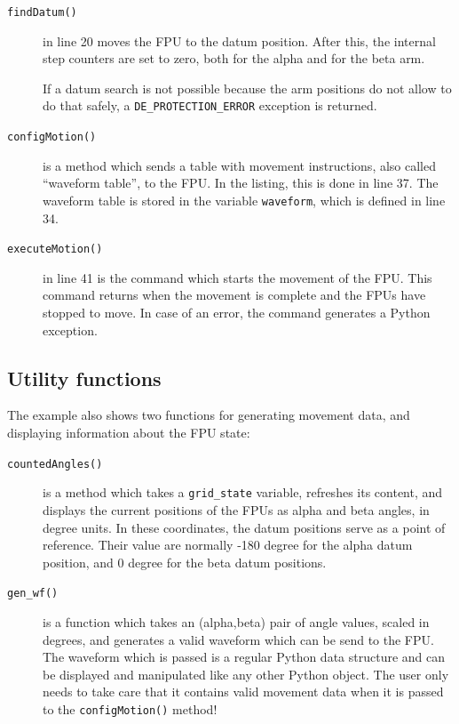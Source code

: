 \documentclass[11pt,a4paper]{scrartcl}
\begin{document}
\begin{description}
\item[\texttt{findDatum()}] in line 20 moves the FPU to the datum
  position. After this, the internal step counters are set to zero,
  both for the alpha and for the beta arm.

  If a datum search is not possible because the arm positions do not
  allow to do that safely, a \texttt{DE\_PROTECTION\_ERROR} exception
  is returned.

\item[\texttt{configMotion()}] is a method which sends a table with
  movement instructions, also called ``waveform table'', to the
  FPU. In the listing, this is done in line 37. The waveform table is
  stored in the variable \texttt{waveform}, which is defined in line
  34.

\item[\texttt{executeMotion()}] in line 41 is the command which starts
  the movement of the FPU. This command returns when the movement is
  complete and the FPUs have stopped to move. In case of an error, the
  command generates a Python exception.

\end{description}

\subsection{Utility functions}
The example also shows two  functions for generating movement
data, and displaying information about the FPU state:

\begin{description}
\item[\texttt{countedAngles()}] is a method which takes a
  \texttt{grid\_state} variable, refreshes its content, and displays
  the current positions of the FPUs as alpha and beta angles, in
  degree units. In these coordinates, the datum positions serve as a
  point of reference. Their value are normally -180 degree for the
  alpha datum position, and 0 degree for the beta datum positions.
  
\item[\texttt{gen\_wf()}] is a function which takes an (alpha,beta)
  pair of angle values, scaled in degrees, and generates a valid
  waveform which can be send to the FPU.  The waveform which is passed
  is a regular Python data structure and can be displayed and
  manipulated like any other Python object.  The user only needs to
  take care that it contains valid movement data when it is passed to
  the \texttt{configMotion()} method!


\end{description}
\end{document}
